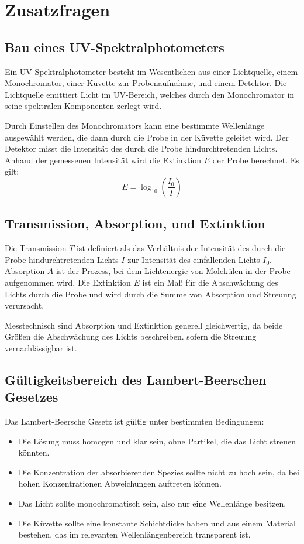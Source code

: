 \section{Zusatzfragen}
\subsection{Bau eines UV-Spektralphotometers}
Ein UV-Spektralphotometer besteht im Wesentlichen aus einer Lichtquelle, einem Monochromator, einer Küvette zur Probenaufnahme, und einem Detektor.
Die Lichtquelle emittiert Licht im UV-Bereich, welches durch den Monochromator in seine spektralen Komponenten zerlegt wird.

Durch Einstellen des Monochromators kann eine bestimmte Wellenlänge ausgewählt werden, die dann durch die Probe in der Küvette geleitet wird.
Der Detektor misst die Intensität des durch die Probe hindurchtretenden Lichts.
Anhand der gemessenen Intensität wird die Extinktion $E$ der Probe berechnet.
Es gilt:
\begin{equation*}
    E = \log_{10} \left( \frac{I_0}{I} \right)
\end{equation*}

\subsection{Transmission, Absorption, und Extinktion}
Die Transmission $T$ ist definiert als das Verhältnis der Intensität des durch die Probe hindurchtretenden Lichts $I$ zur Intensität des einfallenden Lichts $I_0$.
Absorption $A$ ist der Prozess, bei dem Lichtenergie von Molekülen in der Probe aufgenommen wird.
Die Extinktion $E$ ist ein Maß für die Abschwächung des Lichts durch die Probe und wird durch die Summe von Absorption und Streuung verursacht.

Messtechnisch sind Absorption und Extinktion generell gleichwertig, da beide Größen die Abschwächung des Lichts beschreiben. sofern die Streuung vernachlässigbar ist.

\subsection{Gültigkeitsbereich des Lambert-Beerschen Gesetzes}
Das Lambert-Beersche Gesetz ist gültig unter bestimmten Bedingungen:
\begin{itemize}
    \item Die Lösung muss homogen und klar sein, ohne Partikel, die das Licht streuen könnten.
    \item Die Konzentration der absorbierenden Spezies sollte nicht zu hoch sein, da bei hohen Konzentrationen Abweichungen auftreten können.
    \item Das Licht sollte monochromatisch sein, also nur eine Wellenlänge besitzen.
    \item Die Küvette sollte eine konstante Schichtdicke haben und aus einem Material bestehen, das im relevanten Wellenlängenbereich transparent ist.
\end{itemize}

